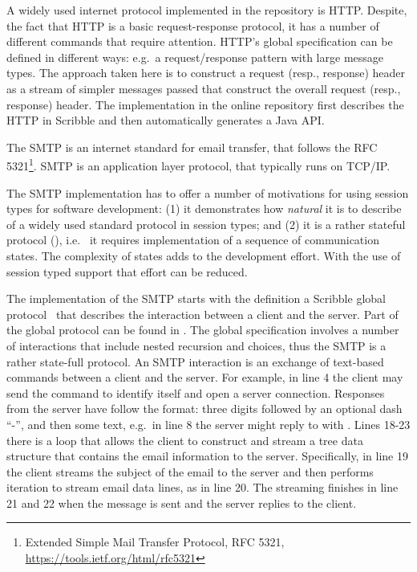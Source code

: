 A widely used internet protocol implemented in the repository is HTTP.
Despite, the fact that HTTP is a basic request-response protocol,
it has a number of different commands that require attention.
HTTP's global specification can be defined in different ways:
e.g.~a request/response pattern with large message types. The approach
taken here is to construct a request (resp., response) header as
a stream of simpler messages passed that construct the overall
request (resp., response) header. The implementation in the online
repository first describes the HTTP in Scribble and then automatically
generates a Java API.
%

The SMTP is an internet standard for email
transfer, that follows the RFC 5321\footnote{Extended Simple Mail Transfer Protocol, RFC 5321,
\url{https://tools.ietf.org/html/rfc5321}}.
SMTP is an application layer protocol, that typically runs on
TCP/IP.

The SMTP implementation has to offer
a number of motivations for using session types for software
development:
(1) it demonstrates how {\em natural} it is
to describe of a widely used standard protocol in session types; and
(2) it is a rather stateful protocol (),
i.e.~ it requires implementation of a sequence of communication states.
The complexity of states adds to the development effort.
With the use of session typed
support that effort can be reduced.

The implementation of the SMTP starts with
the definition a Scribble global protocol~\cite{HuR:smtp}
that describes the interaction between a client and the server.
Part of the global protocol can be found in .
The global specification involves a number of interactions
that include nested recursion and choices, thus the SMTP
is a rather state-full protocol.
%
An SMTP interaction is an exchange of text-based {commands}
between a client and the server.
%
For example, in line 4 the client may send the
 command to identify itself and open a server connection.
Responses from the server have follow  the format:
three digits followed by an optional dash ``-'', and then some text,
e.g.~in line 8 the server might reply to  with . %
Lines 18-23 there is a loop that allows the client to construct
and stream a tree data structure that contains the email information
to the server. Specifically, in line 19 the client streams the subject of the
email to the server and then performs iteration to stream email data lines,
as in line 20. The streaming finishes in line 21 and 22 when the
 message is sent and the server replies to the client.

